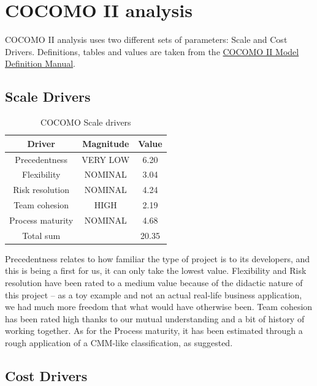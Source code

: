 
\section{COCOMO II analysis}
COCOMO II analysis uses two different sets of parameters: Scale and Cost Drivers. Definitions, tables and values are taken from the \href{http://csse.usc.edu/csse/research/COCOMOII/cocomo2000.0/CII_modelman2000.0.pdf}{COCOMO II Model Definition Manual}.

\subsection{Scale Drivers}

\begin{table}
\begin{center}
\begin{tabular}{ccc}
\toprule
Driver         &   Magnitude   &    Value \\
\midrule
Precedentness   &   VERY LOW   &   6.20   \\
Flexibility      &   NOMINAL   &   3.04   \\
Risk resolution      &   NOMINAL   &   4.24   \\
Team cohesion   &   HIGH   &   2.19   \\
Process maturity   &   NOMINAL   &   4.68   \\
\midrule
Total sum      &        &   20.35   \\
\bottomrule
\end{tabular}
\caption{COCOMO Scale drivers}
\end{center}
\end{table}

Precedentness relates to how familiar the type of project is to its developers, and this is being a first for us, it can only take the lowest value. Flexibility and Risk resolution have been rated to a medium value because of the didactic nature of this project -- as a toy example and not an actual real-life business application, we had much more freedom that what would have otherwise been. Team cohesion has been rated high thanks to our mutual understanding and a bit of history of working together. As for the Process maturity, it has been estimated through a rough application of a CMM-like classification, as suggested.

\subsection{Cost Drivers}

